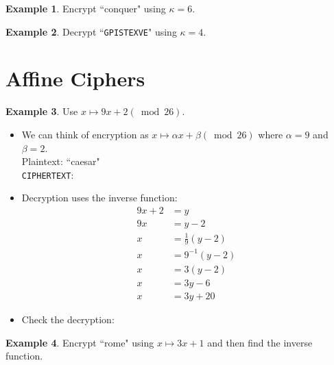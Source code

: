 \documentclass[12pt]{amsart}
\theoremstyle{plain}
\theoremstyle{definition}
\newtheorem*{ex}{Example}
\theoremstyle{remark}
\newcommand{\bit}{\begin{itemize}}
\newcommand{\eit}{\end{itemize}}
\newcommand{\bex}{\begin{ex}}
\newcommand{\eex}{\end{ex}}
\newcommand{\bcen}{\begin{center}}
\newcommand{\ecen}{\end{center}}
\begin{document}
\bex Encrypt ``conquer" using $\kappa = 6$.
\vspace{1in}
\eex


\bex Decrypt ``\texttt{GPISTEXVE}" using $\kappa = 4$.
\vspace{1in}
\eex


\newpage \section{Affine Ciphers}
\bex
Use $x \mapsto 9 x+ 2  (\bmod 26)$.

\bit
	\item We can think of encryption as $x \mapsto \alpha x + \beta (\bmod 26)$ where $\alpha = 9$ and $\beta = 2$.\\
	Plaintext: ``caesar"\\
	\texttt{CIPHERTEXT}: \\
	\item Decryption uses the inverse function:
	\begin{align*}
	9x + 2 &= y\\
	9x &= y-2\\
	x &= \frac{1}{9}(y-2)\\
	x &= 9^{-1}(y-2)\\
	x &= 3(y-2)\\
	x &= 3y-6\\
	x &= 3y+20
	\end{align*}
	\item Check the decryption:
	\vspace{1in}
\eit
\eex

\bex
Encrypt ``rome" using $x \mapsto 3x+1$ and then find the inverse function.
\eex


	
\end{document}
